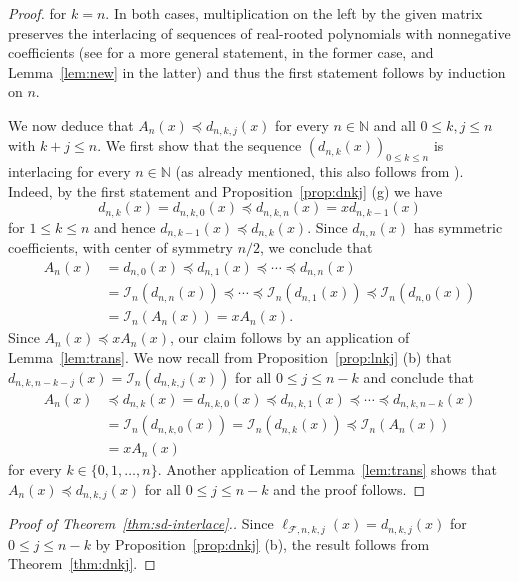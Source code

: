 \documentclass[11pt]{amsart}
\newcommand{\fF}{{\mathcal F}}
\newcommand{\iI}{{\mathcal I}}
\newcommand{\NN}{{\mathbb N}}
\begin{document}
\begin{proof}
\medskip
\noindent
for $k=n$. In both cases, multiplication on the 
left by the given matrix preserves the 
interlacing of sequences of real-rooted 
polynomials with nonnegative coefficients (see 
\cite[Theorem~2.4]{HZ19} for a more general 
statement, in the former case, and 
Lemma~\ref{lem:new} in the latter) and thus the 
first statement follows by induction on $n$.

We now deduce that $A_n(x) \preceq d_{n,k,j}(x)$
for every $n \in \NN$ and all $0 \le k, j \le n$
with $k+j \le n$. We first show that the sequence 
$(d_{n,k}(x))_{0 \le k \le n}$ is interlacing for 
every $n \in \NN$ (as already mentioned, this also 
follows from \cite[Theorem~3.6]{BS21}). Indeed, by 
the first statement and Proposition~\ref{prop:dnkj} 
(g) we have 
%
\[ d_{n,k}(x) = d_{n,k,0}(x) \preceq d_{n,k,n}(x)
   = x d_{n,k-1}(x) \]
% 
for $1 \le k \le n$ and hence $d_{n,k-1}(x) \preceq 
d_{n,k}(x)$. Since $d_{n,n}(x)$ has symmetric 
coefficients, with center of symmetry $n/2$, we 
conclude that 
%
\begin{align*} 
A_n(x) & = d_{n,0}(x) \preceq d_{n,1}(x) \preceq 
\cdots \preceq d_{n,n}(x) \\ & = \iI_n (d_{n,n}(x)) 
\preceq \cdots \preceq \iI_n (d_{n,1}(x)) \preceq 
\iI_n (d_{n,0}(x)) \\ 
       & = \iI_n(A_n(x)) = x A_n(x).
\end{align*}
% 
Since $A_n(x) \preceq x A_n(x)$, our claim follows 
by an application of Lemma~\ref{lem:trans}. We now 
recall from Proposition~\ref{prop:lnkj} (b) that 
$d_{n,k,n-k-j}(x) = \iI_n (d_{n,k,j}(x))$ for all $0 
\le j \le n-k$ and conclude that 
%
\begin{align*} 
A_n(x) & \preceq d_{n,k}(x) = d_{n,k,0}(x) \preceq 
d_{n,k,1}(x) \preceq \cdots \preceq d_{n,k,n-k}(x) 
\\ & = \iI_n (d_{n,k,0}(x)) = \iI_n (d_{n,k}(x))
       \preceq \iI_n(A_n(x)) \\ & = x A_n(x) 
\end{align*}
% 
for every $k \in \{0, 1,\dots,n\}$. Another 
application of Lemma~\ref{lem:trans} shows that
$A_n(x) \preceq d_{n,k,j}(x)$ for all $0 \le j 
\le n-k$ and the proof follows.
\end{proof}

\begin{proof}[Proof of 
              Theorem~\ref{thm:sd-interlace}.]
Since $\ell_{\fF,n,k,j}(x) = d_{n,k,j}(x)$ for 
$0 \le j \le n-k$ by Proposition~\ref{prop:dnkj} 
(b), the result follows from 
Theorem~\ref{thm:dnkj}.
\end{proof}
\end{document}
